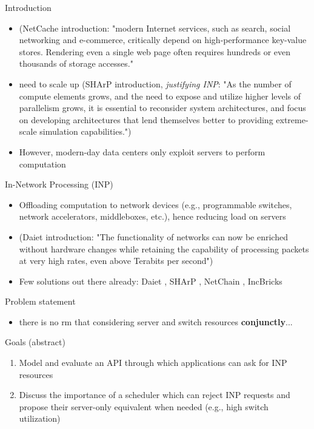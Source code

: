 \begin{frame}[fragile]{Introduction}
  \begin{itemize}
    \item (NetCache introduction: "modern Internet services, such as search, social networking and e-commerce, critically depend on high-performance key-value stores. Rendering even a single web page often requires hundreds or even thousands of storage accesses." \cite{netchain}
    \item need to scale up (SHArP introduction, \textit{justifying INP}: "As the number of compute elements grows, and the need to expose and utilize higher levels of parallelism grows, it is essential to reconsider system architectures, and focus on developing architectures that lend themselves better to providing extreme-scale simulation capabilities.") \cite{sharp}
    \item However, modern-day data centers only exploit servers to perform computation %
  \end{itemize}

\end{frame}
\begin{frame}[fragile]{In-Network Processing (INP)}
  \begin{itemize}
    
    \item Offloading computation to network devices (e.g., programmable switches, network accelerators, middleboxes, etc.), hence reducing load on servers
    \item (Daiet introduction: "The functionality of networks can now be enriched without hardware changes while retaining the capability of processing packets at very high rates, even above Terabits per second") \cite{daiet}
    \item Few solutions out there already: Daiet \cite{daiet}, SHArP \cite{sharp}, NetChain \cite{netchain}, IncBricks \cite{incbricks}
  \end{itemize}
\end{frame}
\begin{frame}[fragile]{Problem statement}
  \begin{itemize}
    \item there is no \gls{rm} that considering server and switch resources \textbf{conjunctly}...
  \end{itemize}
\end{frame}
\begin{frame}[fragile]{Goals}
  (abstract)
  \begin{enumerate}
    \item Model and evaluate an API through which applications can ask for INP resources
    \item Discuss the importance of a scheduler which can reject INP requests and propose their server-only equivalent when needed (e.g., high switch utilization)
  \end{enumerate}
\end{frame}

